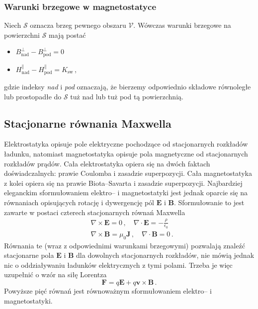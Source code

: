 \documentclass[../main.tex]{subfiles}
\begin{document}
\subsubsection{Warunki brzegowe w magnetostatyce}
Niech \(\mathcal{S}\) oznacza brzeg pewnego obszaru \(\mathcal{V}\). Wówczas warunki brzegowe na powierzchni \(\mathcal{S}\) mają postać
\begin{itemize}
    \item \(B_\text{nad}^\perp-B_\text{pod}^\perp=0\)
    \item \(H^\parallel_\text{nad}-H^\parallel_\text{pod}=K_\text{sw}\)\,,
\end{itemize}
gdzie indeksy \textit{nad} i \textit{pod} oznaczają, że bierzemy odpowiednio składowe równoległe lub prostopadłe do \(\mathcal{S}\) tuż nad lub tuż pod tą powierzchnią.
\newpage
\subsection{Stacjonarne równania Maxwella}
Elektrostatyka opisuje pole elektryczne pochodzące od stacjonarnych rozkładów ładunku, natomiast magnetostatyka opisuje pola magnetyczne od stacjonarnych rozkładów prądów.
Cała elektrostatyka opiera się na dwóch faktach doświadczalnych: prawie Coulomba i zasadzie superpozycji. Cała magnetostatyka z kolei opiera się na prawie Biota--Savarta i zasadzie superpozycji. Najbardziej eleganckim sformułowaniem elektro-- i magnetostatyki jest jednak oparcie się na równaniach opisujących rotację i dywergencję pól \(\mathbf{E}\) i \(\mathbf{B}\). Sformułowanie to jest zawarte w postaci czterech stacjonarnych równań \mbox{Maxwella}
\begin{equation*}
    \begin{split}
        &\nabla\times\mathbf{E}=0\,,\quad\nabla\cdot\mathbf{E}=-\frac{\rho}{\epsilon_0}\\
        &\nabla\times\mathbf{B}=\mu_0\mathbf{J}\,,\quad\nabla\cdot\mathbf{B}=0\,.
    \end{split}
\end{equation*}
Równania te (wraz z odpowiednimi warunkami brzegowymi) pozwalają znaleźć stacjonarne pola \(\mathbf{E}\) i \(\mathbf{B}\) dla dowolnych stacjonarnych rozkładów, nie mówią jednak nic o oddziaływaniu ładunków elektrycznych z tymi polami. Trzeba je więc uzupełnić o wzór na siłę Lorentza
\begin{equation*}
    \mathbf{F}=q\mathbf{E}+q\mathbf{v}\times\mathbf{B}\,.
\end{equation*}
Powyższe pięć równań jest równoważnym sformułowaniem elektro-- i magnetostatyki.\\
\end{document}
